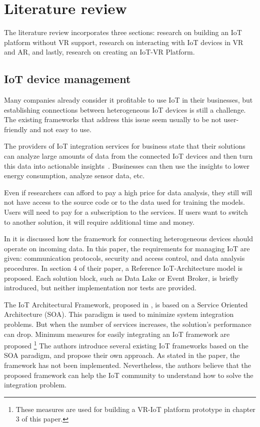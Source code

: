 

\chapter{Literature review}

The literature review incorporates three sections: research on building an IoT platform without VR support, research on interacting with IoT devices in VR and AR, and lastly, research on creating an IoT-VR Platform.

\section{IoT device management}

Many companies already consider it profitable to use IoT in their businesses, but establishing connections between heterogeneous IoT devices is still a challenge. The existing frameworks that address this issue seem usually to be not user-friendly and not easy to use. 

The providers of IoT integration services for business state that their solutions can analyze large amounts of data from the connected IoT devices and then turn this data into actionable insights~\cite{software_ag_software_2020}. Businesses can then use the insights to lower energy consumption, analyze sensor data, etc.

Even if researchers can afford to pay a high price for data analysis, they still will not have access to the source code or to the data used for training the models. Users will need to pay for a subscription to the services. If users want to switch to another solution, it will require additional time and money.

In \cite{k_mohapatra_solution_2016} it is discussed how the framework for connecting heterogeneous devices should operate on incoming data. In this paper, the requirements for managing IoT are given: communication protocols, security and access control, and data analysis procedures. In section 4 of their paper, a Reference IoT-Architecture model is proposed. Each solution block, such as Data Lake or Event Broker, is briefly introduced, but neither implementation nor tests are provided.

The IoT Architectural Framework, proposed in \cite{uviase_iot_2018}, is based on a Service Oriented Architecture (SOA). This paradigm is used to minimize system integration problems. But when the number of services increases, the solution's performance can drop. Minimum measures for easily integrating an IoT framework are proposed \footnote{These measures are used for building a VR-IoT platform prototype in chapter 3 of this paper.} The authors introduce several existing IoT frameworks based on the SOA paradigm, and propose their own approach. As stated in the paper, the framework has not been implemented.  Nevertheless, the authors believe that the proposed framework can help the IoT community to understand how to solve the integration problem.


